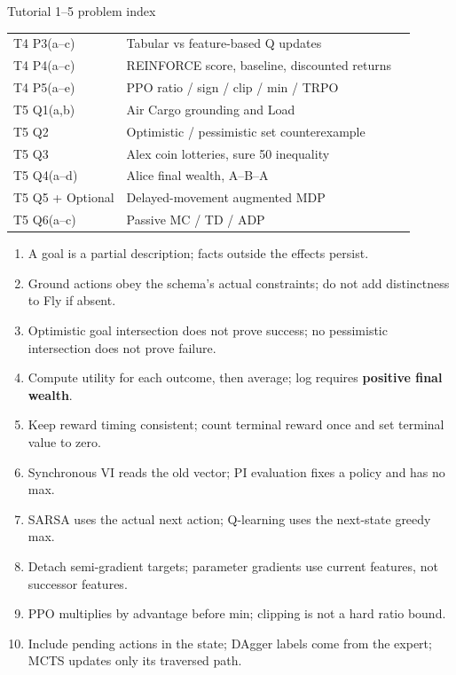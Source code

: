 \documentclass[10pt,a4paper]{article}
\begin{document}
\begin{card}{Tutorial 1--5 problem index}
\begin{tabularx}{\linewidth}{@{}P{2.9cm}Y r@{}}
T4 P3(a--c) & Tabular vs feature-based Q updates & \pageref{q:t4p3} \\
T4 P4(a--c) & REINFORCE score, baseline, discounted returns & \pageref{q:t4p4} \\
T4 P5(a--e) & PPO ratio / sign / clip / min / TRPO & \pageref{q:t4p5} \\
T5 Q1(a,b) & Air Cargo grounding and Load & \pageref{q:t5q1} \\
T5 Q2 & Optimistic / pessimistic set counterexample & \pageref{q:t5q2} \\
T5 Q3 & Alex coin lotteries, sure 50 inequality & \pageref{q:t5q3} \\
T5 Q4(a--d) & Alice final wealth, A--B--A & \pageref{q:t5q4} \\
T5 Q5 + Optional & Delayed-movement augmented MDP & \pageref{q:t5q5} \\
T5 Q6(a--c) & Passive MC / TD / ADP & \pageref{q:t5q6} \\\bottomrule
\end{tabularx}\par\smallskip
\end{card}
\begin{note}
\begin{enumerate}
\item A goal is a partial description; facts outside the effects persist.
\item Ground actions obey the schema's actual constraints; do not add distinctness to Fly if absent.
\item Optimistic goal intersection does not prove success; no pessimistic intersection does not prove failure.
\item Compute utility for each outcome, then average; log requires \textbf{positive final wealth}.
\item Keep reward timing consistent; count terminal reward once and set terminal value to zero.
\item Synchronous VI reads the old vector; PI evaluation fixes a policy and has no max.
\item SARSA uses the actual next action; Q-learning uses the next-state greedy max.
\item Detach semi-gradient targets; parameter gradients use current features, not successor features.
\item PPO multiplies by advantage before min; clipping is not a hard ratio bound.
\item Include pending actions in the state; DAgger labels come from the expert; MCTS updates only its traversed path.
\end{enumerate}
\end{note}
\end{document}
